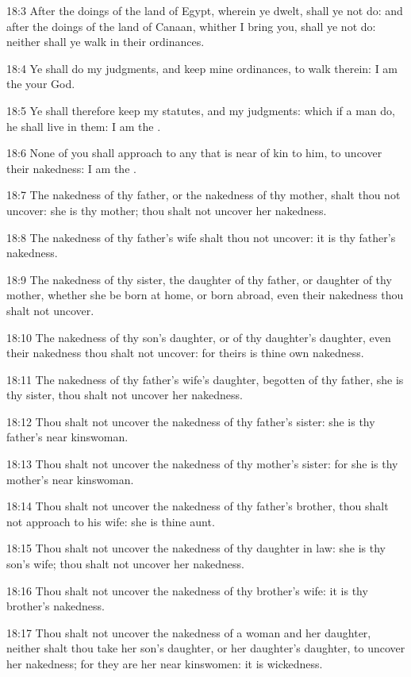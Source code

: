 18:3 After the doings of the land of Egypt, wherein ye dwelt, shall ye
not do: and after the doings of the land of Canaan, whither I bring
you, shall ye not do: neither shall ye walk in their ordinances.

18:4 Ye shall do my judgments, and keep mine ordinances, to walk
therein: I am the \LORD your God.

18:5 Ye shall therefore keep my statutes, and my judgments: which if a
man do, he shall live in them: I am the \LORD.

18:6 None of you shall approach to any that is near of kin to him, to
uncover their nakedness: I am the \LORD.

18:7 The nakedness of thy father, or the nakedness of thy mother,
shalt thou not uncover: she is thy mother; thou shalt not uncover her
nakedness.

18:8 The nakedness of thy father's wife shalt thou not uncover: it is
thy father's nakedness.

18:9 The nakedness of thy sister, the daughter of thy father, or
daughter of thy mother, whether she be born at home, or born abroad,
even their nakedness thou shalt not uncover.

18:10 The nakedness of thy son's daughter, or of thy daughter's
daughter, even their nakedness thou shalt not uncover: for theirs is
thine own nakedness.

18:11 The nakedness of thy father's wife's daughter, begotten of thy
father, she is thy sister, thou shalt not uncover her nakedness.

18:12 Thou shalt not uncover the nakedness of thy father's sister: she
is thy father's near kinswoman.

18:13 Thou shalt not uncover the nakedness of thy mother's sister: for
she is thy mother's near kinswoman.

18:14 Thou shalt not uncover the nakedness of thy father's brother,
thou shalt not approach to his wife: she is thine aunt.

18:15 Thou shalt not uncover the nakedness of thy daughter in law: she
is thy son's wife; thou shalt not uncover her nakedness.

18:16 Thou shalt not uncover the nakedness of thy brother's wife: it
is thy brother's nakedness.

18:17 Thou shalt not uncover the nakedness of a woman and her
daughter, neither shalt thou take her son's daughter, or her
daughter's daughter, to uncover her nakedness; for they are her near
kinswomen: it is wickedness.


